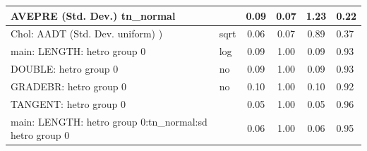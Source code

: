 \begin{table}
\begin{center}
\begin{tabular}{|l|l|c|c|c|l|}
			\hline
			AVEPRE (Std. Dev.) tn_normal &  & 0.09 & 0.07 & 1.23 & 0.22 \\
			\hline
			 Chol: AADT (Std. Dev. uniform) ) & sqrt & 0.06 & 0.07 & 0.89 & 0.37 \\
			\hline
			main: LENGTH: hetro group 0 & log & 0.09 & 1.00 & 0.09 & 0.93 \\
			\hline
			DOUBLE: hetro group 0 & no & 0.09 & 1.00 & 0.09 & 0.93 \\
			\hline
			GRADEBR: hetro group 0 & no & 0.10 & 1.00 & 0.10 & 0.92 \\
			\hline
			TANGENT: hetro group 0 &  & 0.05 & 1.00 & 0.05 & 0.96 \\
			\hline
			main: LENGTH: hetro group 0:tn_normal:sd  hetro group 0 &  & 0.06 & 1.00 & 0.06 & 0.95 \\
			\hline
		\end{tabular}
	\end{center}
\end{table}